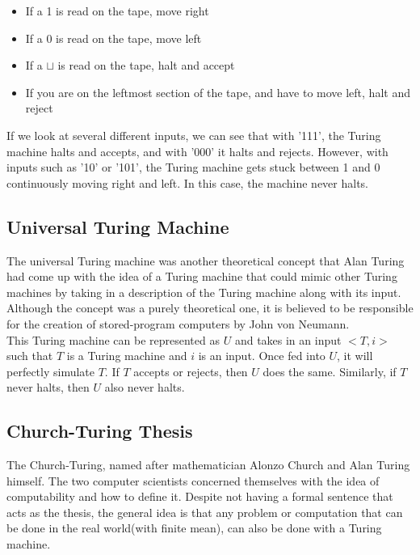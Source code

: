 \documentclass[12pt, letterpaper]{article}
\begin{document}
\begin{itemize}
\item If a 1 is read on the tape, move right
\item If a 0 is read on the tape, move left
\item If a $\sqcup$ is read on the tape, halt and accept
\item If you are on the leftmost section of the tape, and have to move left, halt and reject
\end{itemize}
If we look at several different inputs, we can see that  with '111', the Turing machine halts and accepts, and with '000' it halts and rejects. However, with inputs such as '10' or '101', the Turing machine gets stuck between 1 and 0 continuously moving right and left. In this case, the machine never halts.

\subsection{Universal Turing Machine}
The universal Turing machine was another theoretical concept that Alan Turing had come up with the idea of a Turing machine that could mimic other Turing machines by taking in a description of the Turing machine along with its input. Although the concept was a purely theoretical one, it is believed to be responsible for the creation of stored-program computers by John von Neumann.\cite{kam}\\

This Turing machine can be represented as $U$ and takes in an input $<T,i>$ such that $T$ is a Turing machine and $i$ is an input. Once fed into $U$, it will perfectly simulate $T$. If $T$ accepts or rejects, then $U$ does the same. Similarly, if $T$ never halts, then $U$ also never halts. 

\subsection{Church-Turing Thesis}
The Church-Turing, named after mathematician Alonzo Church and Alan Turing himself. The two computer scientists concerned themselves with the idea of computability and how to define it. Despite not having a formal sentence that acts as the thesis, the general idea is that any problem or computation that can be done in the real world(with finite mean), can also be done with a Turing machine.\\
\end{document}

